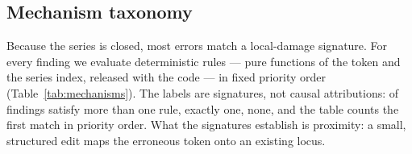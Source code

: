 \documentclass[11pt,a4paper]{article}
\begin{document}
\subsection{Mechanism taxonomy}\label{sec:taxonomy}

Because the series is closed, most errors match a local-damage
signature. For every finding we evaluate deterministic rules --- pure
functions of the token and the series index, released with the code
--- in fixed priority order (Table~\ref{tab:mechanisms}). The labels
are signatures, not causal attributions: \NMechMulti{} of \NFindings{}
findings satisfy more than one rule, \NMechSingle{} exactly one,
\NMechNone{} none, and the table counts the first match in priority
order. What the signatures establish is proximity: a small, structured
edit maps the erroneous token onto an existing locus.


\end{document}
